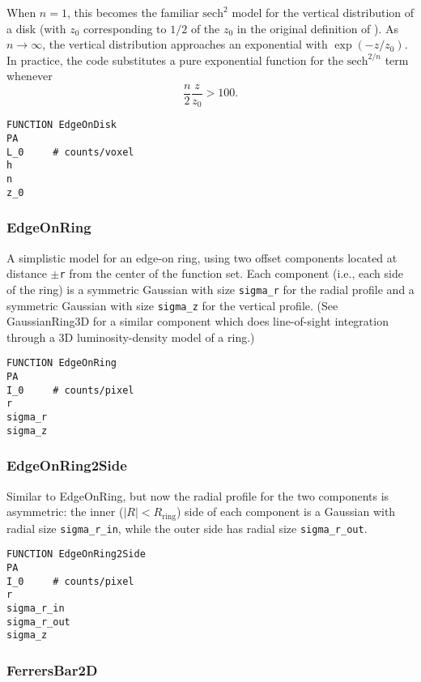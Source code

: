 \documentclass[10pt,a4paper,article]{memoir}
\begin{document}
When $n = 1$, this becomes the familiar $\mathrm{sech}^2$ model for the
vertical distribution of a disk (with $z_{0}$ corresponding to $1/2$ of the
$z_0$ in the original definition of \citet{vdk81}). As $n \rightarrow \infty$,
the vertical distribution approaches an exponential with $\exp(-z/z_{0})$. In practice,
the code substitutes a pure exponential function for the $\mathrm{sech}^{2/n}$ term whenever 
\begin{equation}
\frac{n}{2} \frac{z}{z_{0}} > 100.
\end{equation}

\begin{verbatim}
FUNCTION EdgeOnDisk
PA
L_0     # counts/voxel
h
n
z_0
\end{verbatim}


\subsubsection{EdgeOnRing}

A simplistic model for an edge-on ring, using two offset components located
at distance $\pm$\texttt{r} from the center of the function set. Each component
(i.e., each side of the ring) is a symmetric Gaussian with size
\texttt{sigma\_r} for the radial profile and a symmetric Gaussian with
size \texttt{sigma\_z} for the vertical profile. (See GaussianRing3D for a similar
component which does line-of-sight integration through a 3D luminosity-density
model of a ring.)

\begin{verbatim}
FUNCTION EdgeOnRing
PA
I_0     # counts/pixel
r
sigma_r
sigma_z
\end{verbatim}


\subsubsection{EdgeOnRing2Side}

Similar to EdgeOnRing, but now the radial profile for the two components is
asymmetric: the inner ($|R| < R_{\mathrm{ring}}$) side of each component is a Gaussian
with radial size \texttt{sigma\_r\_in}, while the outer side has radial size
\texttt{sigma\_r\_out}.

\begin{verbatim}
FUNCTION EdgeOnRing2Side
PA
I_0     # counts/pixel
r
sigma_r_in
sigma_r_out
sigma_z
\end{verbatim}


\subsubsection{FerrersBar2D}
\end{document}
